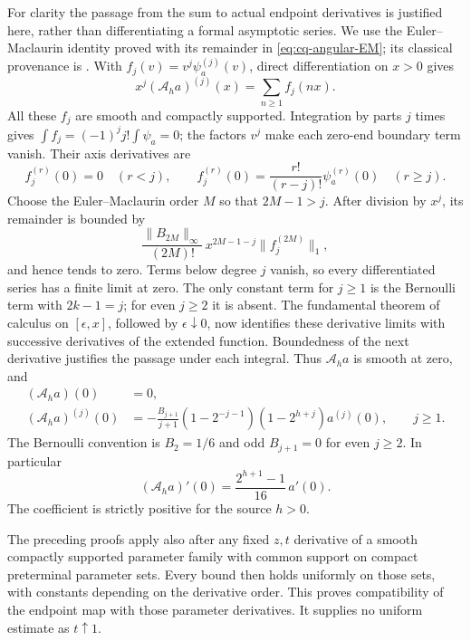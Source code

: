 For clarity the passage from the sum to actual endpoint derivatives
is justified here, rather than differentiating a formal asymptotic
series. We use the Euler--Maclaurin identity proved with its remainder
in \eqref{eq:cq-angular-EM}; its classical provenance is
\cite[\S2.10(i), (2.10.1)]{cqDLMFEM}. With
\(f_j(v)=v^j\psi_a^{(j)}(v)\), direct differentiation on \(x>0\)
gives
\[
 x^j(\mathcal A_ha)^{(j)}(x)=\sum_{n\ge1}f_j(nx).
\]
All these \(f_j\) are smooth and compactly supported. Integration by
parts \(j\) times gives
\(\int f_j=(-1)^j j!\int\psi_a=0\); the factors \(v^j\) make
each zero-end boundary term vanish. Their axis derivatives are
\[
 f_j^{(r)}(0)=0\quad(r<j),\qquad
 f_j^{(r)}(0)=\frac{r!}{(r-j)!}\psi_a^{(r)}(0)\quad(r\ge j).
\]
Choose the Euler--Maclaurin order \(M\) so that \(2M-1>j\).
After division by \(x^j\), its remainder is bounded by
\[
 \frac{\|B_{2M}\|_\infty}{(2M)!}\,
 x^{2M-1-j}\|f_j^{(2M)}\|_1,
\]
and hence tends to zero. Terms below degree \(j\) vanish, so every
differentiated series has a finite limit at zero. The only constant
term for \(j\ge1\) is the Bernoulli term with \(2k-1=j\); for even
\(j\ge2\) it is absent. The fundamental theorem of calculus on
\([\epsilon,x]\), followed by \(\epsilon\downarrow0\), now identifies
these derivative limits with successive derivatives of the extended
function. Boundedness of the next derivative justifies the passage
under each integral. Thus \(\mathcal A_ha\) is smooth at zero, and
\begin{equation}\label{eq:cq-naj:all-jets}
 \begin{split}
 (\mathcal A_ha)(0)&=0,\\
 (\mathcal A_ha)^{(j)}(0)&=
 -\frac{B_{j+1}}{j+1}
 (1-2^{-j-1})(1-2^{h+j})a^{(j)}(0),\qquad j\ge1.
 \end{split}
\end{equation}
The Bernoulli convention is \(B_2=1/6\) and odd \(B_{j+1}=0\)
for even \(j\ge2\).
In particular
\begin{equation}\label{eq:cq-naj:first-map}
 (\mathcal A_ha)'(0)=
       \frac{2^{h+1}-1}{16}\,a'(0).
\end{equation}
The coefficient is strictly positive for the source \(h>0\).

The preceding proofs apply also after any fixed \(z,t\) derivative of
a smooth compactly supported parameter family with common support on
compact preterminal parameter sets. Every bound then holds uniformly
on those sets, with constants depending on the derivative order.
This proves compatibility of the endpoint map with those parameter
derivatives. It supplies no uniform estimate as \(t\uparrow1\).


